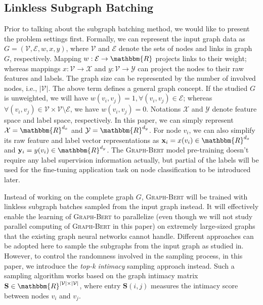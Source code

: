 \documentclass{article}
\newcommand{\mb}{\mathbf}
\newcommand{\mc}{\mathcal}
\newcommand{\our}{\textsc{Graph-Bert}}
\begin{document}
\subsection{Linkless Subgraph Batching}\label{subsec:sampling}

Prior to talking about the subgraph batching method, we would like to present the problem settings first. Formally, we can represent the input graph data as $G = (\mc{V}, \mc{E}, w, x, y)$, where $\mc{V}$ and $\mc{E}$ denote the sets of nodes and links in graph $G$, respectively. Mapping $w: \mc{E} \to \mathbbm{R}$ projects links to their weight; whereas mappings $x: \mc{V} \to \mc{X}$ and $y: \mc{V} \to \mc{Y}$ can project the nodes to their raw features and labels. The graph size can be represented by the number of involved nodes, i.e., $|\mc{V}|$. The above term defines a general graph concept. If the studied $G$ is unweighted, we will have $w(v_i, v_j) = 1, \forall (v_i, v_j) \in \mc{E}$; whereas $\forall (v_i, v_j) \in \mc{V} \times \mc{V} \setminus \mc{E}$, we have $w(v_i, v_j) = 0$. Notations $\mc{X}$ and $\mc{Y}$ denote feature space and label space, respectively. In this paper, we can simply represent $\mc{X} = \mathbbm{R}^{d_x}$ and $\mc{Y} = \mathbbm{R}^{d_y}$. For node $v_i$, we can also simplify its raw feature and label vector representations as $\mb{x}_i = x(v_i) \in \mathbbm{R}^{d_x}$ and $\mb{y}_i = y(v_i) \in \mathbbm{R}^{d_y}$. The {\our} model pre-training doesn't require any label supervision information actually, but partial of the labels will be used for the fine-tuning application task on node classification to be introduced later.

Instead of working on the complete graph $G$, {\our} will be trained with linkless subgraph batches sampled from the input graph instead. It will effectively enable the learning of {\our} to parallelize (even though we will not study parallel computing of {\our} in this paper) on extremely large-sized graphs that the existing graph neural networks cannot handle. Different approaches can be adopted here to sample the subgraphs from the input graph as studied in\cite{ZCG18}. However, to control the randomness involved in the sampling process, in this paper, we introduce the \textit{top-k intimacy} sampling approach instead. Such a sampling algorithm works based on the graph intimacy matrix $\mb{S} \in \mathbbm{R}^{|\mc{V}| \times |\mc{V}|}$, where entry $\mb{S}(i, j)$ measures the intimacy score between nodes $v_i$ and $v_j$.
\end{document}
